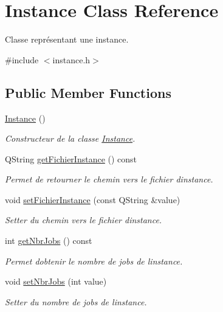 \hypertarget{classInstance}{}\section{Instance Class Reference}
\label{classInstance}


Classe représentant une instance.  




{\ttfamily \#include $<$instance.\+h$>$}

\subsection*{Public Member Functions}
\begin{DoxyCompactItemize}
\item 
\hyperlink{classInstance_a399506c7e75ab9ab78fbc34a25932bbd}{Instance} ()
\begin{DoxyCompactList}\small\item\em Constructeur de la classe \hyperlink{classInstance}{Instance}. \end{DoxyCompactList}\item 
Q\+String \hyperlink{classInstance_a783365375cdab53149f87208374331a7}{get\+Fichier\+Instance} () const
\begin{DoxyCompactList}\small\item\em Permet de retourner le chemin vers le fichier d\textquotesingle{}instance. \end{DoxyCompactList}\item 
void \hyperlink{classInstance_a263461a7a8c44c9e7080620a30cc8fcf}{set\+Fichier\+Instance} (const Q\+String \&value)
\begin{DoxyCompactList}\small\item\em Setter du chemin vers le fichier d\textquotesingle{}instance. \end{DoxyCompactList}\item 
int \hyperlink{classInstance_ad81a535d52b45496e795ea48ed8ce020}{get\+Nbr\+Jobs} () const
\begin{DoxyCompactList}\small\item\em Permet d\textquotesingle{}obtenir le nombre de jobs de l\textquotesingle{}instance. \end{DoxyCompactList}\item 
void \hyperlink{classInstance_a0736cdee9e0838c995893b7ba8545c5d}{set\+Nbr\+Jobs} (int value)
\begin{DoxyCompactList}\small\item\em Setter du nombre de jobs de l\textquotesingle{}instance. \end{DoxyCompactList}\item 

\end{DoxyCompactItemize}
